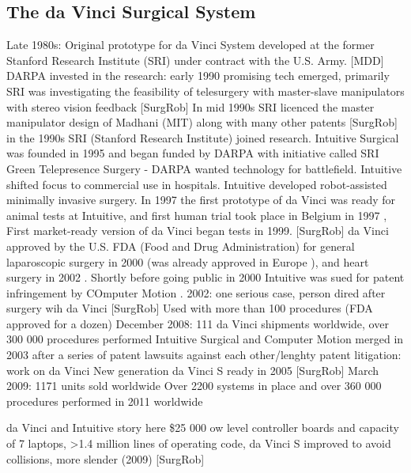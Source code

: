 \subsection{The da Vinci Surgical System}
Late 1980s: Original prototype for da Vinci System developed at the former Stanford Research Institute (SRI) under contract with the U.S. Army. [MDD]
DARPA invested in the research: early 1990 promising tech emerged, primarily SRI was investigating the feasibility of telesurgery with master-slave manipulators with stereo vision feedback [SurgRob]
In mid 1990s SRI licenced the master manipulator design of Madhani (MIT) along with many other patents [SurgRob]
in the 1990s SRI (Stanford Research Institute) joined research. \citep{bib:brown_univ}
Intuitive Surgical was founded in 1995 \citep{bib:intuitive_monopoly} and began funded by DARPA with initiative called SRI Green Telepresence Surgery - DARPA wanted technology for battlefield. Intuitive shifted focus to commercial use in hospitals. Intuitive developed robot-assisted minimally invasive surgery.
In 1997 the first prototype of da Vinci was ready for animal tests at Intuitive, and first human trial took place in Belgium in 1997 \citep{bib:intuitive_monopoly},
First market-ready version of da Vinci began tests in 1999. [SurgRob]
da Vinci approved by the U.S. FDA (Food and Drug Administration) for general laparoscopic surgery in 2000 (was already approved in Europe \citep{bib:intuitive_monopoly}), and heart surgery in 2002 \citep{bib:brown_univ}. Shortly before going public in 2000 Intuitive was sued for patent infringement by COmputer Motion \citep{bib:intuitive_monopoly}.
2002: one serious case, person dired after surgery wih da Vinci [SurgRob]
Used with more than 100 procedures (FDA approved for a dozen)
December 2008: 111 da Vinci shipments worldwide, over 300 000 procedures performed
Intuitive Surgical and Computer Motion merged in 2003 \citep{bib:telesurg_history} after a series of patent lawsuits against each other/lenghty patent litigation: work on da Vinci \citep{bib:intuitive_monopoly}
New generation da Vinci S ready in 2005 [SurgRob]
March 2009: 1171 units sold worldwide \citep{bib:intuitive_monopoly}
Over 2200 systems in place and over 360 000 procedures performed in 2011 worldwide \citep{bib:raven_ii}

da Vinci and Intuitive story here
\$25 000 ow level controller boards and capacity of 7 laptops, >1.4 million lines of operating code, da Vinci S improved to avoid collisions, more slender (2009) [SurgRob]

